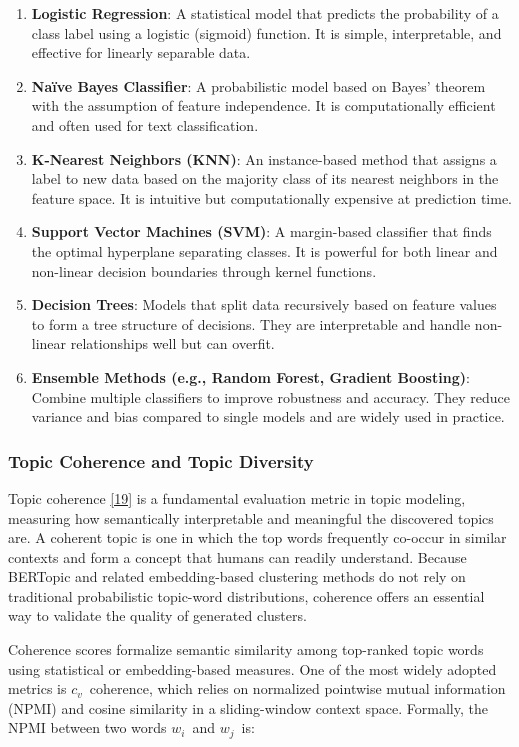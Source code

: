 \documentclass[12pt,oneside,openright,a4paper]{cpe-english-project}
\begin{document}
\begin{enumerate}
\item
  {\textbf{Logistic Regression}: A statistical model that predicts the probability of a class label using a logistic (sigmoid) function. It is simple, interpretable, and effective for linearly separable data.}
\item
  {\textbf{Naïve Bayes Classifier}: A probabilistic model based on Bayes' theorem with the assumption of feature independence. It is computationally efficient and often used for text classification.}
\item
  {\textbf{K-Nearest Neighbors (KNN)}: An instance-based method that assigns a label to new data based on the majority class of its nearest neighbors in the feature space. It is intuitive but computationally expensive at prediction time.}
\item
  {\textbf{Support Vector Machines (SVM)}: A margin-based classifier that finds the optimal hyperplane separating classes. It is powerful for both linear and non-linear decision boundaries through kernel functions.}
\item
  {\textbf{Decision Trees}: Models that split data recursively based on feature values to form a tree structure of decisions. They are interpretable and handle non-linear relationships well but can overfit.}
\item
  {\textbf{Ensemble Methods (e.g., Random Forest, Gradient Boosting)}: Combine multiple classifiers to improve robustness and accuracy. They reduce variance and bias compared to single models and are widely used in practice.}
\end{enumerate}

\subsubsection{Topic Coherence and Topic Diversity}

Topic coherence \hyperlink{bib:ref19}{[19]} is a fundamental evaluation metric in topic modeling, measuring how semantically interpretable and meaningful the discovered topics are. A coherent topic is one in which the top words frequently co-occur in similar contexts and form a concept that humans can readily understand. Because BERTopic and related embedding-based clustering methods do not rely on traditional probabilistic topic-word distributions, coherence offers an essential way to validate the quality of generated clusters.

Coherence scores formalize semantic similarity among top-ranked topic words using statistical or embedding-based measures. One of the most widely adopted metrics is $c_v$~coherence, which relies on normalized pointwise mutual information (NPMI) and cosine similarity in a sliding-window context space. Formally, the NPMI between two words $w_i$~and $w_j$~is:
\end{document}
